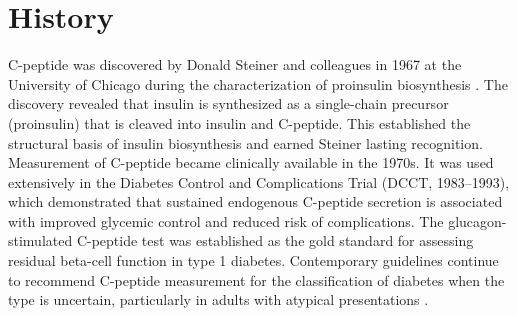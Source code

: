 \section*{History}
C-peptide was discovered by Donald Steiner and colleagues in 1967 at the University of Chicago during the characterization of proinsulin biosynthesis \cite{steiner1967insulin}. The discovery revealed that insulin is synthesized as a single-chain precursor (proinsulin) that is cleaved into insulin and C-peptide. This established the structural basis of insulin biosynthesis and earned Steiner lasting recognition. Measurement of C-peptide became clinically available in the 1970s. It was used extensively in the Diabetes Control and Complications Trial (DCCT, 1983--1993), which demonstrated that sustained endogenous C-peptide secretion is associated with improved glycemic control and reduced risk of complications. The glucagon-stimulated C-peptide test was established as the gold standard for assessing residual beta-cell function in type 1 diabetes. Contemporary guidelines continue to recommend C-peptide measurement for the classification of diabetes when the type is uncertain, particularly in adults with atypical presentations \cite{cryer2009evaluation}.

